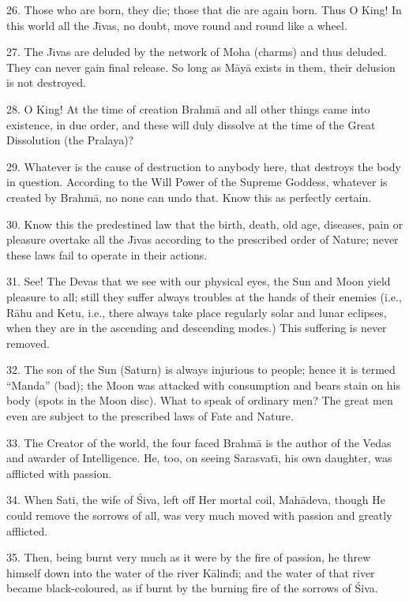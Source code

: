 26. Those who are born, they die; those that die are again born. Thus O King! In this world all the J\={\i}vas, no doubt, move round and round like a wheel.

27. The J\={\i}vas are deluded by the network of Moha (charms) and thus deluded. They can never gain final release. So long as M\=ay\=a exists in them, their delusion is not destroyed.

28. O King! At the time of creation Brahm\=a and all other things came into existence, in due order, and these will duly dissolve at the time of the Great Dissolution (the Pralaya)?

29. Whatever is the cause of destruction to anybody here, that destroys the body in question. According to the Will Power of the Supreme Goddess, whatever is created by Brahm\=a, no none can undo that. Know this as perfectly certain.

30. Know this the predestined law that the birth, death, old age, diseases, pain or pleasure overtake all the J\={\i}vas according to the prescribed order of Nature; never these laws fail to operate in their actions.

31. See! The Devas that we see with our physical eyes, the Sun and Moon yield pleasure to all; still they suffer always troubles at the hands of their enemies (i.e., R\=ahu and Ketu, i.e., there always take place regularly solar and lunar eclipses, when they are in the ascending and descending modes.) This suffering is never removed.

32. The son of the Sun (Saturn) is always injurious to people; hence it is termed ``Manda'' (bad); the Moon was attacked with consumption and bears stain on his body (spots in the Moon disc). What to speak of ordinary men? The great men even are subject to the prescribed laws of Fate and Nature.

33. The Creator of the world, the four faced Brahm\=a is the author of the Vedas and awarder of Intelligence. He, too, on seeing Sarasvat\={\i}, his own daughter, was afflicted with passion.

34. When Sati, the wife of \'Siva, left off Her mortal coil, Mah\=adeva, though He could remove the sorrows of all, was very much moved with passion and greatly afflicted.

35. Then, being burnt very much as it were by the fire of passion, he threw himself down into the water of the river K\=alind\={\i}; and the water of that river became black-coloured, as if burnt by the burning fire of the sorrows of \'Siva.

